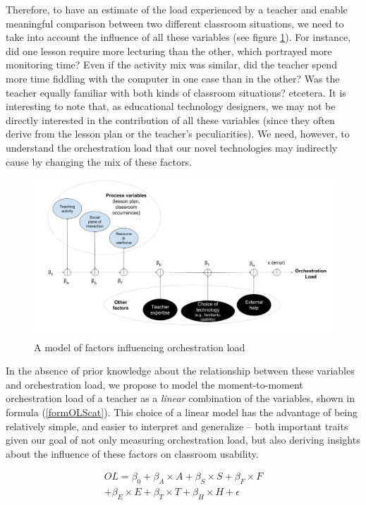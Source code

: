 \documentclass[10pt,journal,compsoc]{IEEEtran}
\begin{document}
Therefore, to have an estimate of the load experienced by a teacher and enable meaningful comparison between two different classroom situations, we need to take into account the influence of all these variables (see figure \ref{fig:model}). For instance, did one lesson require more lecturing than the other, which portrayed more monitoring time? Even if the activity mix was similar, did the teacher spend more time fiddling with the computer in one case than in the other? Was the teacher equally familiar with both kinds of classroom situations? etcetera. It is interesting to note that, as educational technology designers, we may not be directly interested in the contribution of all these variables (since they often derive from the lesson plan or the teacher's peculiarities). We need, however, to understand the orchestration load that our novel technologies may indirectly cause by changing the mix of these factors.


\begin{figure}[!t]
\centering
\includegraphics[width=\linewidth]{ModelFactorsOL}
\caption{A model of factors influencing orchestration load}
\label{fig:model}
\end{figure}

In the absence of prior knowledge about the relationship between these variables and orchestration load, we propose to model the moment-to-moment orchestration load of a teacher as a \textit{linear} combination of the variables, shown in formula (\ref{formOLScat}). This choice of a linear model has the advantage of being relatively simple, and easier to interpret and generalize -- both important traits given our goal of not only measuring orchestration load, but also deriving insights about the influence of these factors on classroom usability.

\begin{multline}
\label{formOLScat}
OL = \beta_0 + \beta_A\times{}A + \beta_S\times{}S + \beta_F\times{}F \\ + \beta_E\times{}E + \beta_T\times{}T + \beta_H\times{}H + \epsilon
\end{multline}
\end{document}

